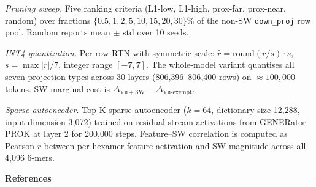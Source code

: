 \documentclass[11pt]{article}
\begin{document}
\textit{Pruning sweep.}
Five ranking criteria (L1-low, L1-high, prox-far, prox-near,
random) over fractions $\{0.5, 1, 2, 5, 10, 15, 20, 30\}\%$ of the
non-SW \texttt{down\_proj} row pool. Random reports mean $\pm$ std
over 10 seeds.

\textit{INT4 quantization.}
Per-row RTN with symmetric scale:
$\hat{r} = \mathrm{round}(r/s)\cdot s$, $s = \max|r|/7$, integer
range $[-7,7]$. The whole-model variant quantises all seven
projection types across 30 layers (806{,}396--806{,}400 rows) on
$\approx 100{,}000$ tokens. SW marginal cost is
$\Delta_{\mathrm{Yu+SW}} - \Delta_{\mathrm{Yu\text{-}exempt}}$.

\textit{Sparse autoencoder.}
Top-K sparse autoencoder ($k = 64$, dictionary size 12{,}288, input
dimension 3{,}072) trained on residual-stream activations from
GENERator PROK at layer 2 for 200{,}000 steps. Feature--SW
correlation is computed as Pearson $r$ between per-hexamer feature
activation and SW magnitude across all 4{,}096 6-mers.

\textbf{References}
\end{document}
